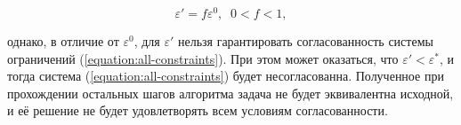 \documentclass[a4paper, 10pt]{article}
\theoremstyle{definition}
\theoremstyle{plain}
\theoremstyle{plain}
\begin{document}
\begin{equation}
 \varepsilon' = f \varepsilon^{0}, \;\; 0 < f < 1,
\end{equation}

однако, в отличие от $\varepsilon^{0}$, для $\varepsilon'$ нельзя
гарантировать согласованность системы ограничений
(\ref{equation:all-constraints}). При этом может оказаться, что
$\varepsilon' < \varepsilon^{*}$, и тогда система
(\ref{equation:all-constraints}) будет несогласованна. Полученное при
прохождении остальных шагов алгоритма задача не будет эквивалентна
исходной, и её решение не будет удовлетворять всем условиям согласованности.



\end{document}
